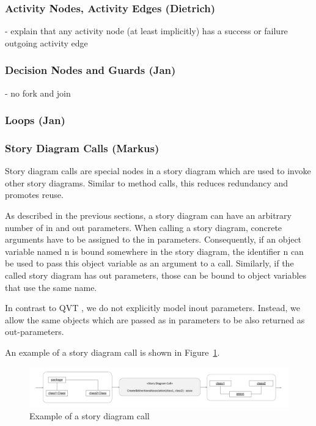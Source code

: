 \subsubsection{Activity Nodes, Activity Edges (Dietrich)}
- explain that any activity node (at least implicitly) has a success or failure outgoing activity edge

\subsubsection{Decision Nodes and Guards (Jan)}
- no fork and join

\subsubsection{Loops (Jan)}

\subsubsection{Story Diagram Calls (Markus)}

Story diagram calls are special nodes in a story diagram which are used to invoke other story diagrams. Similar to method calls, this reduces redundancy and promotes reuse.

As described in the previous sections, a story diagram can have an arbitrary number of in and out parameters. When calling a story diagram, concrete arguments have to be assigned to the in parameters. Consequently, if an object variable named n is bound somewhere in the story diagram, the identifier n can be used to pass this object variable as an argument to a call. Similarly, if the called story diagram has out parameters, those can be bound to object variables that use the same name.

In contrast to QVT \cite{QVT}, we do not explicitly model inout parameters. Instead, we allow the same objects which are passed as in parameters to be also returned as out-parameters.

An example of a story diagram call is shown in Figure~\ref{fig:call}.

\begin{figure}[htb]
\begin{center}
  \includegraphics[width=\textwidth]{figures/StoryDiagramCall}
  \caption{Example of a story diagram call}
  \label{fig:call}
\end{center}
\end{figure}

